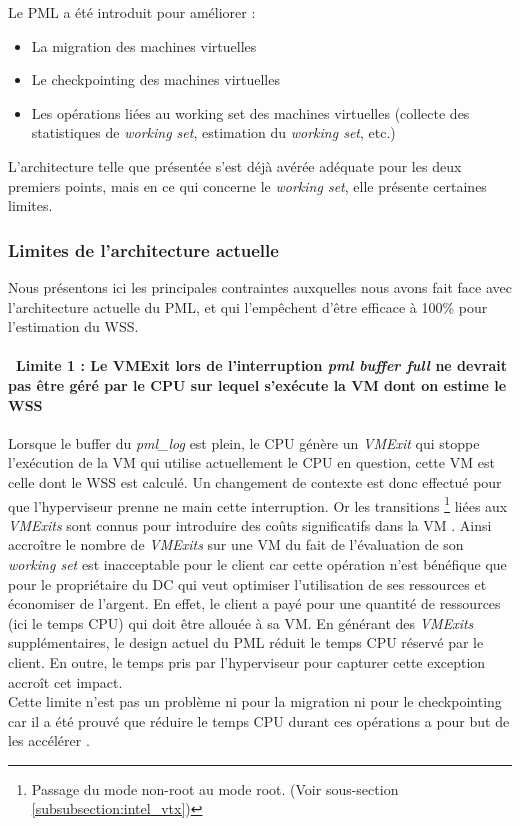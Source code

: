 \noindent Le PML a été introduit pour améliorer :
\begin{itemize}
    \item La migration des machines virtuelles
    \item Le checkpointing \cite{checkpointing} des machines virtuelles
    \item Les opérations liées au working set des machines virtuelles (collecte des statistiques de \textit{working set}, estimation du \textit{working set}, etc.)
\end{itemize}

\noindent L'architecture telle que présentée s'est déjà avérée adéquate pour les deux premiers points, mais en ce qui concerne le \textit{working set}, elle présente certaines limites.

\subsubsection{Limites de l'architecture actuelle}
Nous présentons ici les principales contraintes auxquelles nous avons fait face avec l'architecture actuelle du PML, et qui l'empêchent d'être efficace à 100\% pour l'estimation du WSS.

\paragraph{\textbullet\ \textbf{Limite 1 : Le VMExit lors de l'interruption \textit{pml buffer full} ne devrait pas être géré par le CPU sur lequel s'exécute la VM dont on estime le WSS}}
\par\noindent
\par\noindent Lorsque le buffer du \textit{pml\_log} est plein, le CPU génère un \textit{VMExit} qui stoppe l'exécution de la VM qui utilise actuellement le CPU en question, cette VM est celle dont le WSS est calculé. Un changement de contexte est donc effectué pour que l'hyperviseur prenne ne main cette interruption. Or les transitions \footnote{Passage du mode non-root au mode root. (Voir sous-section \ref{subsubsection:intel_vtx})} liées aux \textit{VMExits} sont connus pour introduire des coûts significatifs dans la VM \cite{overhead_VMExit}. Ainsi accroître le nombre de \textit{VMExits} sur une VM du fait de l'évaluation de son \textit{working set} est inacceptable pour le client car cette opération n'est bénéfique que pour le propriétaire du DC qui veut optimiser l'utilisation de ses ressources et économiser de l'argent. En effet, le client a payé pour une quantité de ressources (ici le temps CPU) qui doit être allouée à sa VM. En générant des \textit{VMExits} supplémentaires, le design actuel du PML réduit le temps CPU réservé par le client. En outre, le temps pris par l'hyperviseur pour capturer cette exception accroît cet impact.\\
Cette limite n'est pas un problème ni pour la migration ni pour le checkpointing car il a été prouvé que réduire le temps CPU durant ces opérations a pour but de les accélérer \cite{cpu_time_migration}.


